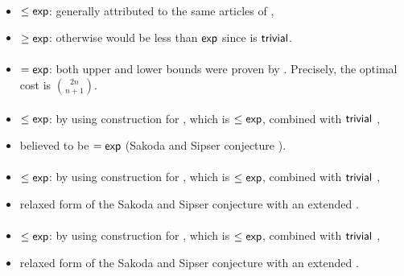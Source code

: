 \paragraph{\TNFA{}\tto\ODFA}\label{cost:2NFAto1DFA}
\begin{itemize}
	\item $\le\mathsf{exp}$: generally attributed to the same articles of \hyperref[cost:2DFAto1DFA]{\TDFA{}\tto\ODFA},
	\item $\ge\mathsf{exp}$: otherwise \hyperref[cost:1NFAto1DFA]{\ONFA{}\tto\ODFA} would be less than $\mathsf{exp}$ since \ONFA{}\tto\TNFA is $\mathsf{trivial}$.
\end{itemize}
\paragraph{\TNFA{}\tto\ONFA}
\begin{itemize}
	\item $=\mathsf{exp}$: both upper and lower bounds were proven by . Precisely, the optimal cost is $\binom{2n}{n+1}$.
\end{itemize}
\paragraph{\TNFA{}\tto\TDFA}
\begin{itemize}
	\item $\le\mathsf{exp}$: by using construction for \hyperref[cost:2NFAto1DFA]{\TNFA{}\tto\ODFA}, which is $\le\mathsf{exp}$, combined with $\mathsf{trivial}$ \ODFA{}\tto\TDFA,
	\item believed to be $=\mathsf{exp}$ (Sakoda and Sipser conjecture \cite{SakSip78}).
\end{itemize}
\paragraph{\ONFA{}\tto\ODLA}
\begin{itemize}
	\item $\le\mathsf{exp}$: by using construction for \hyperref[cost:1NFAto1DFA]{\ONFA{}\tto\ODFA}, which is $\le\mathsf{exp}$, combined with $\mathsf{trivial}$ \ODFA{}\tto\ODLA,
	\item relaxed form of the Sakoda and Sipser conjecture with an extended \TDFA.
\end{itemize}
\paragraph{\TNFA{}\tto\ODLA}
\begin{itemize}
	\item $\le\mathsf{exp}$: by using construction for \hyperref[cost:2NFAto1DFA]{\TNFA{}\tto\ODFA}, which is $\le\mathsf{exp}$, combined with $\mathsf{trivial}$ \ODFA{}\tto\ODLA,
	\item relaxed form of the Sakoda and Sipser conjecture with an extended \TDFA.
\end{itemize}
